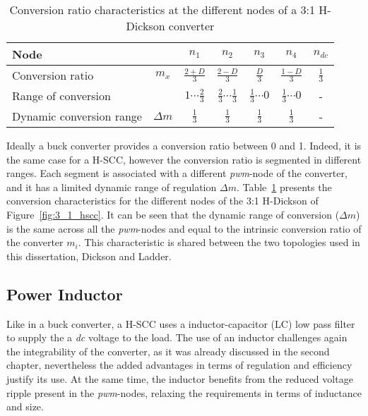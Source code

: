 \begin{table}[h]

\centering
\caption{Conversion ratio characteristics at the different nodes of a 3:1 H-Dickson converter}
\label{tab:3:1 H-Dick_M}
\renewcommand{\arraystretch}{1.5}%
\begin{tabular}{l  c | c c c c c }
 Node &  & $n_1$ & $n_2$ & $n_3$ & $n_4$ & $n_{dc}$ \\
 \midrule
 Conversion ratio & $m_x$ & $\frac{2+D}{3} $    & $\frac{2-D}{3} $ & $\frac{D}{3} $ & $\frac{1-D}{3} $ & $\frac{1}{3}$ \\
 Range of conversion &       & $1 \cdots \frac{2}{3}$ & $\frac{2}{3} \cdots \frac{1}{3} $ & $\frac{1}{3} \cdots 0$ & $\frac{1}{3} \cdots 0 $ & - \\
 Dynamic conversion range & $\Delta m$ &  $\frac{1}{3}$ &  $\frac{1}{3}$ &  $\frac{1}{3}$ &  $\frac{1}{3}$ &  -
\end{tabular}
\end{table}

Ideally a buck converter provides a conversion ratio between 0 and 1. Indeed, it is the same case for a H-SCC, however the conversion ratio is segmented in different ranges. Each segment is associated with a different \emph{pwm}-node of the converter, and it has a limited dynamic range of regulation $\Delta m$. Table~\ref{tab:3:1 H-Dick_M} presents the conversion characteristics for the different nodes of the 3:1 H-Dickson of Figure~\ref{fig:3_1_hscc}. It can be seen that the dynamic range of conversion ($\Delta m$) is the same across all the \emph{pwm}-nodes and equal to the intrinsic conversion ratio of the converter $m_i$. This characteristic is shared between the two topologies used in this dissertation, Dickson and Ladder.

\subsection{Power Inductor}
\label{ch:power_inductor}

Like in a buck converter, a H-SCC uses a inductor-capacitor (LC) low pass filter to supply the a \emph{dc} voltage to the load. The use of an inductor challenges again the integrability of the converter, as it was already discussed in the second chapter, nevertheless the added advantages in terms of regulation and efficiency justify its use. At the same time, the inductor benefits from the reduced voltage ripple present in the \emph{pwm}-nodes, relaxing the requirements in terms of inductance and size.

